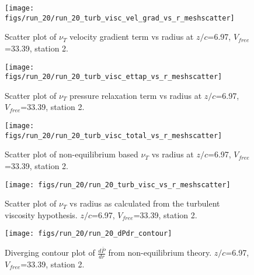 \begin{figure}[H]
\centering
\texttt{[image: figs/run\_20/run\_20\_turb\_visc\_vel\_grad\_vs\_r\_meshscatter]}
\caption{Scatter plot of $\nu_T$ velocity gradient term vs radius at $z/c$=6.97, $V_{free}$=33.39, station 2.}
\end{figure}


\begin{figure}[H]
\centering
\texttt{[image: figs/run\_20/run\_20\_turb\_visc\_ettap\_vs\_r\_meshscatter]}
\caption{Scatter plot of $\nu_T$ pressure relaxation term vs radius at $z/c$=6.97, $V_{free}$=33.39, station 2.}
\end{figure}


\begin{figure}[H]
\centering
\texttt{[image: figs/run\_20/run\_20\_turb\_visc\_total\_vs\_r\_meshscatter]}
\caption{Scatter plot of non-equilibrium based $\nu_T$ vs radius at $z/c$=6.97, $V_{free}$=33.39, station 2.}
\end{figure}


\begin{figure}[H]
\centering
\texttt{[image: figs/run\_20/run\_20\_turb\_visc\_vs\_r\_meshscatter]}
\caption{Scatter plot of $\nu_T$ vs radius as calculated from the turbulent viscosity hypothesis. $z/c$=6.97, $V_{free}$=33.39, station 2.}
\end{figure}


\begin{figure}[H]
\centering
\texttt{[image: figs/run\_20/run\_20\_dPdr\_contour]}
\caption{Diverging contour plot of $\frac{d\bar{P}}{dr}$ from non-equilibrium theory. $z/c$=6.97, $V_{free}$=33.39, station 2.}
\end{figure}


